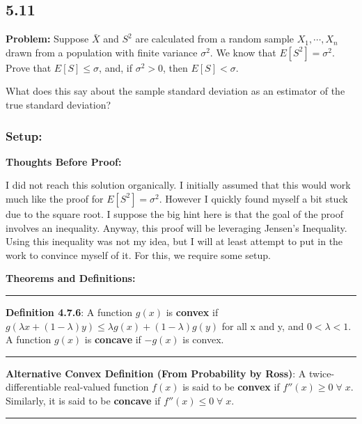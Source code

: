 \subsection*{5.11}

\noindent\textbf{Problem:} Suppose $\bar{X}$ and $S^2$ are calculated from a random sample $X_1, \cdots, X_n$ drawn from a population with finite variance $\sigma^2$. We know that $E[S^2] = \sigma^2$. Prove that $E[S] \leq \sigma$, and, if $\sigma^2 > 0$, then $E[S] < \sigma$.

What does this say about the sample standard deviation as an estimator of the true standard deviation?

\subsubsection*{Setup:}

\noindent\textbf{Thoughts Before Proof:}

I did not reach this solution organically. I initially assumed that this would work much like the proof for $E[S^2] = \sigma^2$. However I quickly found myself a bit stuck due to the square root. I suppose the big hint here is that the goal of the proof involves an inequality. Anyway, this proof will be leveraging Jensen's Inequality. Using this inequality was not my idea, but I will at least attempt to put in the work to convince myself of it. For this, we require some setup.

\noindent\textbf{Theorems and Definitions:}

\vspace{0.75em}
\hrule
\vspace{0.75em}
\noindent\textbf{Definition 4.7.6}:
A function $g(x)$ is \textbf{convex} if $g(\lambda x + (1 - \lambda)y) \leq \lambda g(x) + (1 - \lambda)g(y)$ for all x and y, and $0 < \lambda < 1$. A function $g(x)$ is \textbf{concave} if $-g(x)$ is convex.

\vspace{0.75em}
\hrule
\vspace{0.75em}

\noindent\textbf{Alternative Convex Definition (From Probability by Ross)}:
A twice-differentiable real-valued function $f(x)$ is said to be \textbf{convex} if $f''(x) \geq 0 \;\forall\; x$. Similarly, it is said to be \textbf{concave} if $f''(x) \leq 0 \;\forall\; x$.

\vspace{0.75em}
\hrule
\vspace{0.75em}

